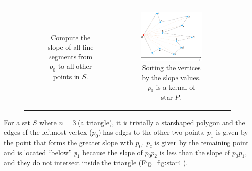 \documentclass [12pt]{article}
\begin{document}
\begin{enumerate}[label=(\alph*)]
\begin{figure}[h]
\begin{tabular}{ccc}
\begin{subfigure}{0.33\textwidth}
                    \caption{Compute the slope of all line segments from $p_0$ to all other points in $S$.}
                    \label{fig:star2}
                \end{subfigure}&
                \begin{subfigure}{0.33\textwidth}
                    \centering
                    \includegraphics[width=1\textwidth]{images/star3.PNG}
                    \caption{Sorting the vertices by the slope values. $p_0$ is a kernal of star $P$.}
                    \label{fig:star3}
                \end{subfigure} 
            \end{tabular}
            \caption{}
            \label{fig:bigstar}
        \end{figure}

        \pagebreak


        For a set $S$ where $n = 3$ (a triangle), it is trivially a starshaped polygon and the edges of the leftmost vertex ($p_0$) has edges to the other two points. $p_1$ is given by the point that forms the greater slope with $p_0$. $p_2$ is given by the remaining point and is located ``below'' $p_1$ because the slope of $\overline{p_0 p_2}$ is less than the slope of $\overline{p_0 p_1}$, and they do not intersect inside the triangle (Fig. \ref{fig:star4}).


\end{enumerate}
\end{document}
